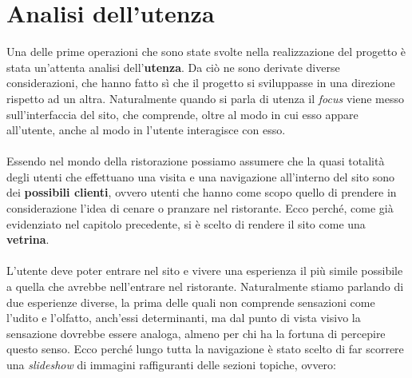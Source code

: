 \section{Analisi dell'utenza}

Una delle prime operazioni che sono state svolte nella realizzazione del progetto è stata un'attenta analisi dell'\textbf{utenza}. Da ciò ne sono derivate diverse considerazioni, che hanno fatto sì che il progetto si sviluppasse in una direzione rispetto ad un altra. Naturalmente quando si parla di utenza il \textit{focus} viene messo sull'interfaccia del sito, che comprende, oltre al modo in cui esso appare all'utente, anche al modo in l'utente interagisce con esso. \\ \\
Essendo nel mondo della ristorazione possiamo assumere che la quasi totalità degli utenti che effettuano una visita e una navigazione all'interno del sito sono dei \textbf{possibili clienti}, ovvero utenti che hanno come scopo quello di prendere in considerazione l'idea di cenare o pranzare nel ristorante. Ecco perché, come già evidenziato nel capitolo precedente, si è scelto di rendere il sito come una \textbf{vetrina}. \\ \\
L'utente deve poter entrare nel sito e vivere una esperienza il più simile possibile a quella che avrebbe nell'entrare nel ristorante. Naturalmente stiamo parlando di due esperienze diverse, la prima delle quali non comprende sensazioni come l'udito e l'olfatto, anch'essi determinanti, ma dal punto di vista visivo la sensazione dovrebbe essere analoga, almeno per chi ha la fortuna di percepire questo senso. Ecco perché lungo tutta la navigazione è stato scelto di far scorrere una \textit{slideshow} di immagini raffiguranti delle sezioni topiche, ovvero:

